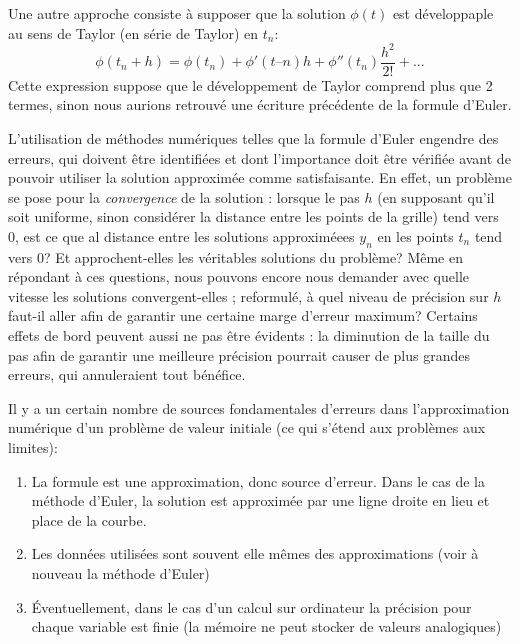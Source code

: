 \documentclass[12pt]{article}
\begin{document}
\quad Une autre approche consiste à supposer que la solution $\phi(t)$ est développaple au sens de Taylor (en série de Taylor) en $t_n$:
\begin{equation}
\phi (t_n + h) = \phi (t_n) + \phi'(t–n)h + \phi''(t_n) \frac{h^2}{2!} + ...
\end{equation}
Cette expression suppose que le développement de Taylor comprend plus que 2 termes, sinon nous aurions retrouvé une écriture précédente de la formule d'Euler.

\quad L'utilisation de méthodes numériques telles que la formule d'Euler engendre des erreurs, qui doivent être identifiées et dont l'importance doit être vérifiée avant de pouvoir utiliser la solution approximée comme satisfaisante. En effet, un problème se pose pour la \emph{convergence} de la solution : lorsque le pas $h$ (en supposant qu'il soit uniforme, sinon considérer la distance entre les points de la grille) tend vers 0, est ce que al distance entre les solutions approximéees $y_n$ en les points $t_n$ tend vers 0? Et approchent-elles les véritables solutions du problème?
Même en répondant à ces questions, nous pouvons encore nous demander avec quelle vitesse les solutions convergent-elles ; reformulé, à quel niveau de précision sur $h$ faut-il aller afin de garantir une certaine marge d'erreur maximum? Certains effets de bord peuvent aussi ne pas être évidents : la diminution de la taille du pas afin de garantir une meilleure précision pourrait causer de plus grandes erreurs, qui annuleraient tout bénéfice.

Il y a un certain nombre de sources fondamentales d'erreurs dans l'approximation numérique d'un problème de valeur initiale (ce qui s'étend aux problèmes aux limites):
\begin{enumerate}
 	\item La formule est une approximation, donc source d'erreur. Dans le cas de la méthode d'Euler, la solution est approximée par une ligne droite en lieu et place de la courbe.
	\item Les données utilisées sont souvent elle mêmes des approximations (voir à nouveau la méthode d'Euler)
	\item Éventuellement, dans le cas d'un calcul sur ordinateur la précision pour chaque variable est finie (la mémoire ne peut stocker de valeurs analogiques)
\end{enumerate}
\end{document}
